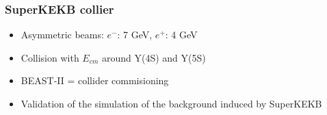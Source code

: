\documentclass{beamer}
\begin{document}
  \begin{frame}[plain]
    \frametitle{SuperKEKB collier}

    \begin{itemize}
      \item Asymmetric beams: $e^-$: 7 GeV, $e^+$: 4 GeV
      \item Collision with $E_{cm}$ around Y(4S) and Y(5S)
      \item BEAST-II = collider commisioning 
      \item Validation of the simulation of the background induced by SuperKEKB
    \end{itemize}
  \end{frame}





\end{document}
